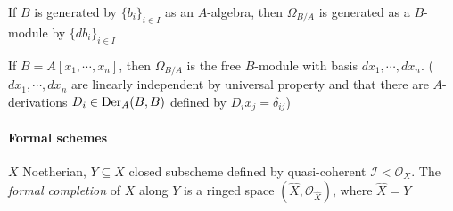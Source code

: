 \documentclass[main]{subfiles}
\begin{document}
\clubsuit\quad If $B$ is generated by $\{b_i\}_{i\in I}$ as an $A$-algebra, then $\Omega_{B/A}$ is generated as a $B$-module by $\{db_i\}_{i\in I}$

\begin{example}
If $B=A[x_1,\cdots,x_n]$, then $\Omega_{B/A}$ is the free $B$-module with basis $dx_1,\cdots,dx_n$. ($dx_1,\cdots,dx_n$ are linearly independent by universal property and that there are $A$-derivations $D_i\in\operatorname{Der}_A(B,B)$ defined by $D_ix_j=\delta_{ij}$)
\end{example}

\paragraph{Formal schemes} $X$ Noetherian, $Y\subseteq X$ closed subscheme defined by quasi-coherent $\mathcal I<\mathcal O_X$. The \textit{formal completion} of $X$ along $Y$ is a ringed space $(\hat X,\mathcal O_{\hat X})$, where $\hat X=Y$
\end{document}
